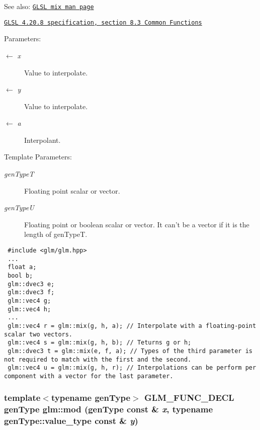 \begin{Desc}
\item[See also:]\href{http://www.opengl.org/sdk/docs/manglsl/xhtml/mix.xml}{\tt GLSL mix man page} 

\href{http://www.opengl.org/registry/doc/GLSLangSpec.4.20.8.pdf}{\tt GLSL 4.20.8 specification, section 8.3 Common Functions}\end{Desc}
\begin{Desc}
\item[Parameters:]
\begin{description}
\item[\mbox{$\leftarrow$} {\em x}]Value to interpolate. \item[\mbox{$\leftarrow$} {\em y}]Value to interpolate. \item[\mbox{$\leftarrow$} {\em a}]Interpolant.\end{description}
\end{Desc}
\begin{Desc}
\item[Template Parameters:]
\begin{description}
\item[{\em genTypeT}]Floating point scalar or vector. \item[{\em genTypeU}]Floating point or boolean scalar or vector. It can't be a vector if it is the length of genTypeT.\end{description}
\end{Desc}


\begin{Code}\begin{verbatim} #include <glm/glm.hpp>
 ...
 float a;
 bool b;
 glm::dvec3 e;
 glm::dvec3 f;
 glm::vec4 g;
 glm::vec4 h;
 ...
 glm::vec4 r = glm::mix(g, h, a); // Interpolate with a floating-point scalar two vectors. 
 glm::vec4 s = glm::mix(g, h, b); // Teturns g or h;
 glm::dvec3 t = glm::mix(e, f, a); // Types of the third parameter is not required to match with the first and the second.
 glm::vec4 u = glm::mix(g, h, r); // Interpolations can be perform per component with a vector for the last parameter.
\end{verbatim}
\end{Code}

 \hypertarget{group__core__func__common_ge03755d98416b59e5d791665c6b6895a}{
\subsubsection[mod]{\setlength{\rightskip}{0pt plus 5cm}template$<$typename genType$>$ GLM\_\-FUNC\_\-DECL genType glm::mod (genType const \& {\em x}, \/  typename genType::value\_\-type const \& {\em y})}}
\label{group__core__func__common_ge03755d98416b59e5d791665c6b6895a}


